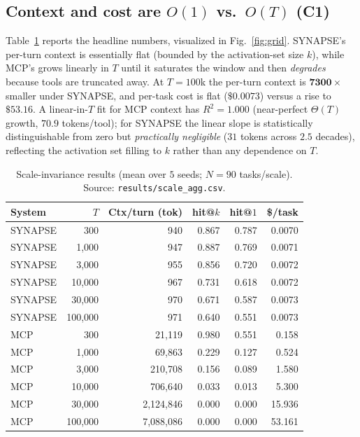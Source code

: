 \documentclass[11pt]{article}
\theoremstyle{plain}
\theoremstyle{definition}
\begin{document}
\subsection{Context and cost are $O(1)$ vs.\ $O(T)$ (C1)}
Table~\ref{tab:scale} reports the headline numbers, visualized in
Fig.~\ref{fig:grid}. SYNAPSE's per-turn context
is essentially flat (bounded by the activation-set size $k$), while MCP's grows
linearly in $T$ until it saturates the window and then \emph{degrades} because
tools are truncated away. At $T{=}100$k the per-turn context is
$\mathbf{7300\times}$ smaller under SYNAPSE, and per-task cost
is flat ($\$0.0073$) versus a rise to $\mathbf{\$53.16}$. A linear-in-$T$
fit for MCP context has $R^2{=}1.000$ (near-perfect $\Theta(T)$ growth,
$70.9$ tokens/tool); for
SYNAPSE the linear slope is statistically distinguishable from zero but
\emph{practically negligible} ($31$ tokens
across $2.5$ decades), reflecting the activation set filling to $k$ rather than
any dependence on $T$.

\begin{table}[t]
\centering
\caption{Scale-invariance results (mean over $5$ seeds; $N{=}90$ tasks/scale).
Source: \texttt{results/scale\_agg.csv}.}
\label{tab:scale}
\small
\begin{tabular}{lrrrrr}
\toprule
System & $T$ & Ctx/turn (tok) & hit@$k$ & hit@$1$ & \$/task \\
\midrule
SYNAPSE & 300     & 940       & 0.867 & 0.787 & 0.0070 \\
SYNAPSE & 1{,}000 & 947       & 0.887 & 0.769 & 0.0071 \\
SYNAPSE & 3{,}000 & 955       & 0.856 & 0.720 & 0.0072 \\
SYNAPSE & 10{,}000& 967       & 0.731 & 0.618 & 0.0072 \\
SYNAPSE & 30{,}000& 970       & 0.671 & 0.587 & 0.0073 \\
SYNAPSE & 100{,}000& 971      & 0.640 & 0.551 & 0.0073 \\
\midrule
MCP & 300     & 21{,}119     & 0.980 & 0.551 & 0.158 \\
MCP & 1{,}000 & 69{,}863     & 0.229 & 0.127 & 0.524 \\
MCP & 3{,}000 & 210{,}708    & 0.156 & 0.089 & 1.580 \\
MCP & 10{,}000& 706{,}640    & 0.033 & 0.013 & 5.300 \\
MCP & 30{,}000& 2{,}124{,}846& 0.000 & 0.000 & 15.936 \\
MCP & 100{,}000& 7{,}088{,}086& 0.000 & 0.000 & 53.161 \\
\bottomrule
\end{tabular}
\end{table}
\end{document}
